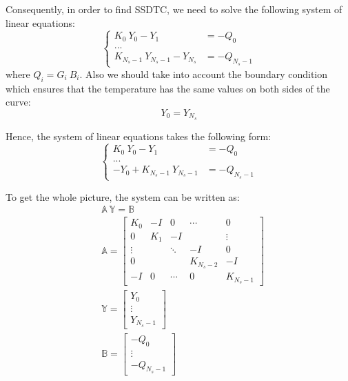 Consequently, in order to find SSDTC, we need to solve the following system of linear equations:
\[
  \begin{cases}
    K_0 \: Y_0 - Y_1 & = -Q_0 \\
    ... \\
    K_{N_s - 1} \: Y_{N_s - 1} - Y_{N_s} & = -Q_{N_s - 1}
  \end{cases}
\]
where $Q_i = G_i \: B_i$. Also we should take into account the boundary condition which ensures that the temperature has the same values on both sides of the curve:
\begin{equation} \label{eq:boundary-condition}
  Y_0 = Y_{N_s}
\end{equation}

Hence, the system of linear equations takes the following form:
\[
  \begin{cases}
    K_0 \: Y_0 - Y_1 & = -Q_0 \\
    ... \\
    -Y_0 + K_{N_s - 1} \: Y_{N_s - 1} & = -Q_{N_s - 1}
  \end{cases}
\]

To get the whole picture, the system can be written as:
\begin{align}
  & \mathbb{A} \: \mathbb{Y} = \mathbb{B} \label{eq:system} \\
  & \mathbb{A} = \left[
    \begin{array}{ccccc}
      K_0 & -I & 0 & \cdots & 0 \\
      0 & K_1 & -I &  & \vdots \\
      \vdots &  & \ddots & -I & 0 \\
      0 &  &  & K_{N_s - 2} & -I \\
      -I & 0 & \cdots & 0 & K_{N_s - 1}
    \end{array}
  \right] \nonumber \\
  & \mathbb{Y} = \left[
    \begin{array}{c}
      Y_0 \\
      \vdots \\
      Y_{N_s - 1}
    \end{array}
  \right] \nonumber \\
  & \mathbb{B} = \left[
    \begin{array}{c}
      -Q_0 \\
      \vdots \\
      -Q_{N_s - 1}
    \end{array}
  \right] \nonumber
\end{align}

